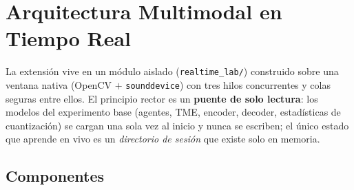 \section{Arquitectura Multimodal en Tiempo Real}
\label{sec:arquitectura}

La extensión vive en un módulo aislado (\texttt{realtime\_lab/}) construido sobre una
ventana nativa (OpenCV \cite{bradski2000opencv} $+$ \texttt{sounddevice}) con tres
hilos concurrentes y colas seguras entre ellos.
El principio rector es un \textbf{puente de solo lectura}: los modelos del experimento
base (agentes, TME, encoder, decoder, estadísticas de cuantización) se cargan una sola
vez al inicio y nunca se escriben; el único estado que aprende en vivo es un
\emph{directorio de sesión} que existe solo en memoria.

\subsection{Componentes}

